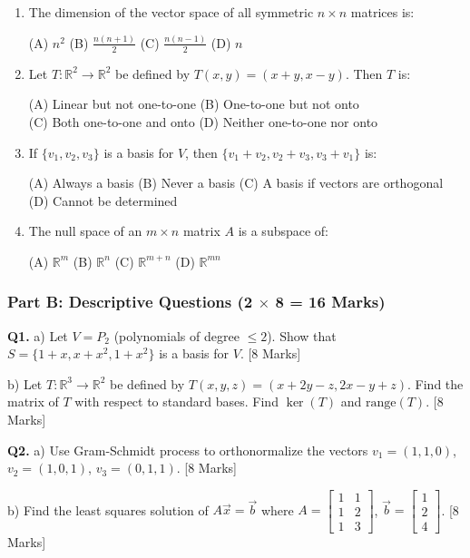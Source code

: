 \documentclass[11pt,a4paper]{article}
\begin{document}
\begin{enumerate}
\item The dimension of the vector space of all symmetric $n \times n$ matrices is:

(A) $n^2$ \quad (B) $\frac{n(n+1)}{2}$ \quad (C) $\frac{n(n-1)}{2}$ \quad (D) $n$

\item Let $T: \mathbb{R}^2 \to \mathbb{R}^2$ be defined by $T(x,y) = (x+y, x-y)$. Then $T$ is:

(A) Linear but not one-to-one \quad (B) One-to-one but not onto\\
(C) Both one-to-one and onto \quad (D) Neither one-to-one nor onto

\item If $\{v_1, v_2, v_3\}$ is a basis for $V$, then $\{v_1 + v_2, v_2 + v_3, v_3 + v_1\}$ is:

(A) Always a basis \quad (B) Never a basis \quad (C) A basis if vectors are orthogonal \quad (D) Cannot be determined

\item The null space of an $m \times n$ matrix $A$ is a subspace of:

(A) $\mathbb{R}^m$ \quad (B) $\mathbb{R}^n$ \quad (C) $\mathbb{R}^{m+n}$ \quad (D) $\mathbb{R}^{mn}$
\end{enumerate}

\subsubsection*{Part B: Descriptive Questions (2 $\times$ 8 = 16 Marks)}

\textbf{Q1.} a) Let $V = P_2$ (polynomials of degree $\leq 2$). Show that $S = \{1+x, x+x^2, 1+x^2\}$ is a basis for $V$. \hfill [8 Marks]

b) Let $T: \mathbb{R}^3 \to \mathbb{R}^2$ be defined by $T(x,y,z) = (x+2y-z, 2x-y+z)$. Find the matrix of $T$ with respect to standard bases. Find $\ker(T)$ and $\text{range}(T)$. \hfill [8 Marks]

\textbf{Q2.} a) Use Gram-Schmidt process to orthonormalize the vectors $v_1 = (1,1,0)$, $v_2 = (1,0,1)$, $v_3 = (0,1,1)$. \hfill [8 Marks]

b) Find the least squares solution of $A\vec{x} = \vec{b}$ where $A = \begin{bmatrix} 1 & 1 \\ 1 & 2 \\ 1 & 3 \end{bmatrix}$, $\vec{b} = \begin{bmatrix} 1 \\ 2 \\ 4 \end{bmatrix}$. \hfill [8 Marks]
\end{document}
